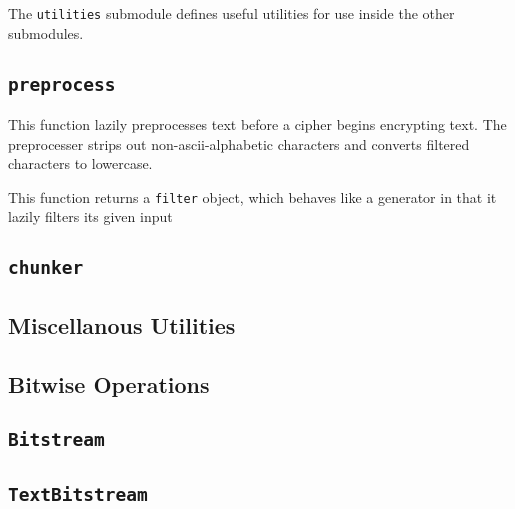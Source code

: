 
The \texttt{utilities} submodule defines useful utilities for use inside the other submodules.

\subsection{\texttt{preprocess}}
    This function lazily preprocesses text before a cipher begins encrypting text. The preprocesser strips out non-ascii-alphabetic characters and converts filtered characters to lowercase.

    This function returns a \texttt{filter} object, which behaves like a generator in that it lazily filters its given input

\subsection{\texttt{chunker}}
\subsection{Miscellanous Utilities}
\subsection{Bitwise Operations}
\subsection{\texttt{Bitstream}}
\subsection{\texttt{TextBitstream}}
